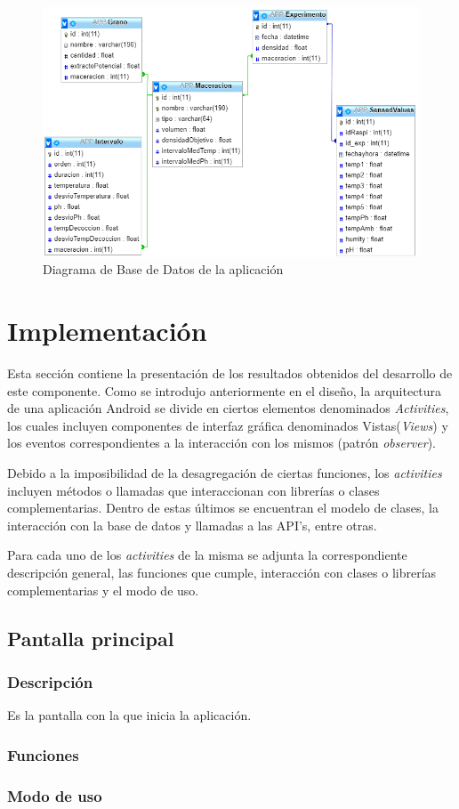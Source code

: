         \begin{figure}[h]
            \centering
            \includegraphics[scale=0.8]{DiagramaBaseDeDatosAPP.jpg}
            \caption{Diagrama de Base de Datos de la aplicación}
            \label{fig:DiagramaBdApp}
        \end{figure}

\section{Implementación}
    \par Esta sección contiene la presentación de los resultados obtenidos del desarrollo de este componente. Como se introdujo anteriormente en el diseño, la arquitectura de una aplicación Android se divide en ciertos elementos denominados \textit{Activities}, los cuales incluyen componentes de interfaz gráfica denominados Vistas(\textit{Views}) y los eventos correspondientes a la interacción con los mismos (patrón \textit{observer}).
    
    \par Debido a la imposibilidad de la desagregación de ciertas funciones, los \textit{activities} incluyen métodos o llamadas que interaccionan con librerías o clases complementarias. Dentro de estas últimos se encuentran el modelo de clases, la interacción con la base de datos y llamadas a las API's, entre otras.
    
    \par Para cada uno de los \textit{activities} de la misma se adjunta la correspondiente descripción general, las funciones que cumple, interacción con clases o librerías complementarias y el modo de uso. 
    
    
        \subsection{Pantalla principal}
            \subsubsection{Descripción}
                \par Es la pantalla con la que inicia la aplicación.
            \subsubsection{Funciones}
            \subsubsection{Modo de uso}
